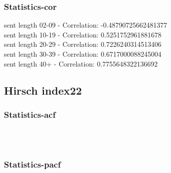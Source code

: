 \documentclass{article}%
\begin{document}
%
\newpage%
\subsubsection{Statistics{-}cor}%
\label{ssubsec:Statistics{-}cor}%
\noindent%
sent length 02-09 - Correlation: -0.48790725662481377\\%
sent length 10-19 - Correlation: 0.5251752961881678\\%
sent length 20-29 - Correlation: 0.7226240314513406\\%
sent length 30-39 - Correlation: 0.6717000088245004\\%
sent length 40+ - Correlation: 0.7755648322136692\\

%
\newpage

%
\subsection{Hirsch index22}%
\label{subsec:Hirschindex22}%
\subsubsection{Statistics{-}acf}%
\label{ssubsec:Statistics{-}acf}%


\begin{figure}[ht]%
\centering%
\setlength{\abovecaptionskip}{-35pt}%
%
%
\\%
%
%
\\%
%
\end{figure}

%
\newpage%
\subsubsection{Statistics{-}pacf}%
\label{ssubsec:Statistics{-}pacf}%
\end{document}
